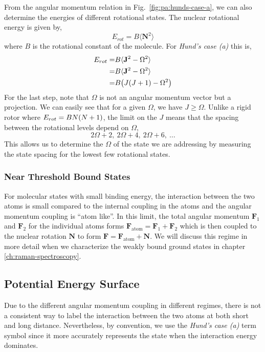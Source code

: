 From the angular momentum relation in Fig.~\ref{fig:pa:hunds-case-a},
we can also determine the energies of different rotational states.
The nuclear rotational energy is given by,
\[
  E_{rot}=B\langle \mathbf{N}^2 \rangle
\]
where $B$ is the rotational constant of the molecule.
For \textit{Hund's case (a)} this is,
\begin{align*}
  E_{rot}=&B\langle \mathbf{J}^2 - \Omega^2 \rangle\\
  =&B\langle \mathbf{J}^2 - \Omega^2 \rangle\\
  =&B{\left({J{\left({J+1}\right)}-\Omega^2}\right)}
\end{align*}
For the last step, note that $\Omega$ is not an angular momentum vector but a projection.
We can easily see that for a given $\Omega$, we have $J\geqslant\Omega$.
Unlike a rigid rotor where $E_{rot}=BN{\left({N+1}\right)}$,
the limit on the $J$ means that the spacing between the rotational levels depend on $\Omega$,
\[2\Omega+2,\ 2\Omega+4,\ 2\Omega+6,\ \dots\]
This allows us to determine the $\Omega$ of the state we are addressing
by measuring the state spacing for the lowest few rotational states.

\subsubsection{Near Threshold Bound States}
\label{ch:pa:structure:near-threshold}

For molecular states with small binding energy, the interaction between the two atoms is
small compared to the internal coupling in the atoms and
the angular momentum coupling is ``atom like''.
In this limit, the total angular momentum $\mathbf{F}_1$ and $\mathbf{F}_2$
for the individual atoms forms $\mathbf{F}_{\mathrm{atom}}=\mathbf{F}_1+\mathbf{F}_2$
which is then coupled to the nuclear rotation $\mathbf{N}$
to form $\mathbf{F}=\mathbf{F}_{\mathrm{atom}}+\mathbf{N}$.
We will discuss this regime in more detail
when we characterize the weakly bound ground states in chapter \ref{ch:raman-spectroscopy}.

\subsection{Potential Energy Surface}
\label{ch:pa:pes}

Due to the different angular momentum coupling in different regimes,
there is not a consistent way to label the interaction between the two atoms
at both short and long distance.
Nevertheless, by convention, we use the \textit{Hund's case (a)} term symbol
since it more accurately represents the state when the interaction energy dominates.

